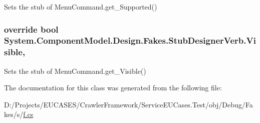 Sets the stub of Menu\-Command.\-get\-\_\-\-Supported()

\hypertarget{class_system_1_1_component_model_1_1_design_1_1_fakes_1_1_stub_designer_verb_a681a5dee750b417a92dcedb8d2d46900}{
\subsubsection[{Visible}]{\setlength{\rightskip}{0pt plus 5cm}override bool System.\-Component\-Model.\-Design.\-Fakes.\-Stub\-Designer\-Verb.\-Visible\hspace{0.3cm}{\ttfamily [get]}, {\ttfamily [set]}}}\label{class_system_1_1_component_model_1_1_design_1_1_fakes_1_1_stub_designer_verb_a681a5dee750b417a92dcedb8d2d46900}


Sets the stub of Menu\-Command.\-get\-\_\-\-Visible()



The documentation for this class was generated from the following file\-:\begin{DoxyCompactItemize}
\item 
D\-:/\-Projects/\-E\-U\-C\-A\-S\-E\-S/\-Crawler\-Framework/\-Service\-E\-U\-Cases.\-Test/obj/\-Debug/\-Fakes/s/\hyperlink{s_2f_8cs}{f.\-cs}\end{DoxyCompactItemize}
